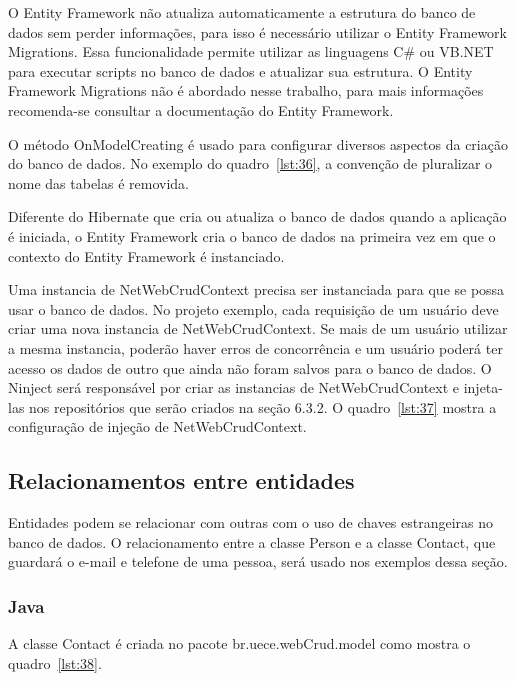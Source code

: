 \documentclass[a4paper,12pt]{article}
\newcommand{\javacode}[3] {
	
}
\newcommand{\sharpcode}[3] {
	
}
\begin{document}
O Entity Framework não atualiza automaticamente a estrutura do banco de dados sem perder informações, para isso é necessário utilizar o Entity Framework Migrations. Essa funcionalidade permite utilizar as linguagens C\# ou VB.NET para executar scripts no banco de dados e atualizar sua estrutura. O Entity Framework Migrations não é abordado nesse trabalho, para mais informações recomenda-se consultar a documentação do Entity Framework.

O método OnModelCreating é usado para configurar diversos aspectos da criação do banco de dados.  No exemplo do quadro~\ref{lst:36}, a convenção de pluralizar o nome das tabelas é removida.

Diferente do Hibernate que cria ou atualiza o banco de dados quando a aplicação é iniciada, o Entity Framework cria o banco de dados na primeira vez em que o contexto do Entity Framework é instanciado.

Uma instancia de NetWebCrudContext precisa ser instanciada para que se possa usar o banco de dados. No projeto exemplo, cada requisição de um usuário deve criar uma nova instancia de NetWebCrudContext. Se mais de um usuário utilizar a mesma instancia, poderão haver erros de concorrência e um usuário poderá ter acesso os dados de outro que ainda não foram salvos para o banco de dados. O Ninject será responsável por criar as instancias de NetWebCrudContext e injeta-las nos repositórios que serão criados na seção 6.3.2. O quadro~\ref{lst:37} mostra a configuração de injeção de NetWebCrudContext.

\sharpcode{code/37.txt}{Injeção do contexto do banco de dados}{lst:37}

\subsection{Relacionamentos entre entidades}

Entidades podem se relacionar com outras com o uso de chaves estrangeiras no banco de dados. O relacionamento entre a classe Person e a classe Contact, que guardará o e-mail e telefone de uma pessoa, será usado nos exemplos dessa seção.

\subsubsection{Java}

A classe Contact é criada no pacote br.uece.webCrud.model como mostra o quadro~\ref{lst:38}.

\javacode{code/38.txt}{Classe Contact no projeto Java}{lst:38}
\end{document}
